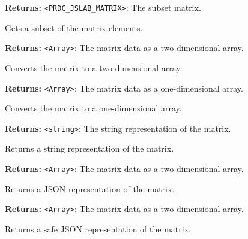 \documentclass[12pt,a4paper]{article}
\begin{document}
\noindent \textbf{Returns:} \texttt{<PRDC\_JSLAB\_MATRIX>}: The subset matrix.

\noindent Gets a subset of the matrix elements.

\vspace{5mm}
\noindent {}


\noindent \textbf{Returns:} \texttt{<Array>}: The matrix data as a two-dimensional array.

\noindent Converts the matrix to a two-dimensional array.

\vspace{5mm}
\noindent {}


\noindent \textbf{Returns:} \texttt{<Array>}: The matrix data as a one-dimensional array.

\noindent Converts the matrix to a one-dimensional array.

\vspace{5mm}
\noindent {}


\noindent \textbf{Returns:} \texttt{<string>}: The string representation of the matrix.

\noindent Returns a string representation of the matrix.

\vspace{5mm}
\noindent {}


\noindent \textbf{Returns:} \texttt{<Array>}: The matrix data as a two-dimensional array.

\noindent Returns a JSON representation of the matrix.

\vspace{5mm}
\noindent {}


\noindent \textbf{Returns:} \texttt{<Array>}: The matrix data as a two-dimensional array.

\noindent Returns a safe JSON representation of the matrix.
\end{document}
